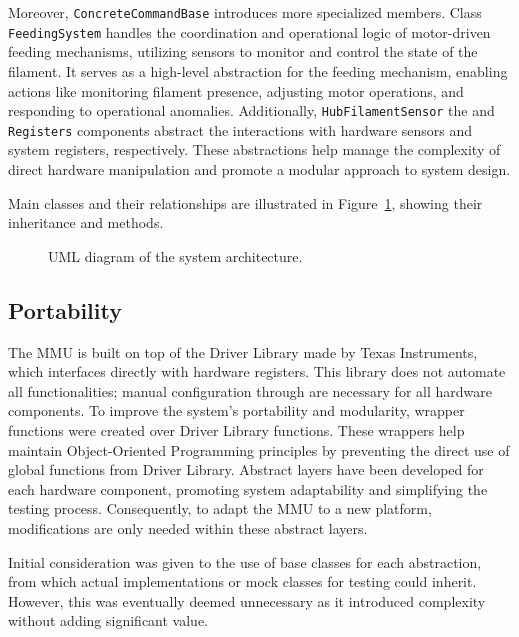 Moreover, \texttt{ConcreteCommandBase} introduces more specialized members. Class \texttt{FeedingSystem} handles the coordination and operational logic of motor-driven feeding mechanisms, utilizing sensors to monitor and control the state of the filament. It serves as a high-level abstraction for the feeding mechanism, enabling actions like monitoring filament presence, adjusting motor operations, and responding to operational anomalies. Additionally, \texttt{HubFilamentSensor} the and \texttt{Registers} components abstract the interactions with hardware sensors and system registers, respectively. These abstractions help manage the complexity of direct hardware manipulation and promote a modular approach to system design.

Main classes and their relationships are illustrated in Figure~\ref{fig:uml_diagram}, showing their inheritance and methods.

\begin{figure}[ht]
    \centering
    \scalebox{1}{
        
    }
    \vspace{15pt}
    \caption{UML diagram of the system architecture.}
    \label{fig:uml_diagram}
\end{figure}

\subsection{Portability}

The MMU is built on top of the Driver Library \cite{driver-lib} made by Texas Instruments, which interfaces directly with hardware registers. This library does not automate all functionalities; manual configuration through are necessary for all hardware components. To improve the system's portability and modularity, wrapper functions were created over Driver Library functions. These wrappers help maintain Object-Oriented Programming principles by preventing the direct use of global functions from Driver Library. Abstract layers have been developed for each hardware component, promoting system adaptability and simplifying the testing process. Consequently, to adapt the MMU to a new platform, modifications are only needed within these abstract layers.

Initial consideration was given to the use of base classes for each abstraction, from which actual implementations or mock classes for testing could inherit. However, this was eventually deemed unnecessary as it introduced complexity without adding significant value.

